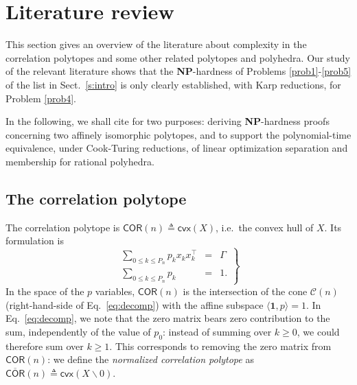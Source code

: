 \documentclass[envcountsect,envcountsame]{svjour3}
\theoremstyle{changebreak}                %
\newcommand{\transpose}[1]{{#1}^{\top}}
\newcommand{\cvx}[1]{\mathsf{cvx}(#1)}
\newcommand{\COR}[1]{\mathsf{COR}(#1)}
\newcommand{\nCOR}[1]{\mathsf{\overline{COR}}(#1)}
\newcommand{\CONX}[1]{\mathcal{C}(#1)}
\begin{document}
\section{Literature review}
\label{s:litrev}
This section gives an overview of the literature about complexity in the correlation polytopes and some other related polytopes and polyhedra. Our study of the relevant literature shows that the \textbf{NP}-hardness of Problems \ref{prob1}-\ref{prob5} of the list in Sect.~\ref{s:intro} is only clearly established, with Karp reductions, for Problem \ref{prob4}.

In the following, we shall cite \cite{gls} for two purposes: deriving \textbf{NP}-hardness proofs concerning two affinely isomorphic polytopes, and to support the polynomial-time equivalence, under Cook-Turing reductions, of linear optimization separation and membership for rational polyhedra. 

\subsection{The correlation polytope}
The correlation polytope \cite{pitowsky} is $\COR{n}\triangleq\cvx{X}$, i.e.~the convex hull of $X$. Its formulation is
\begin{equation}
  \left.\begin{array}{rcl}
    \sum\limits_{0\le k\le P_n} p_k x_k\transpose{x}_k &=& \Gamma \\
    \sum\limits_{0\le k\le P_n} p_k &=& 1.
    \end{array}\right\}
  \label{eq:cor}
\end{equation}
In the space of the $p$ variables, $\COR{n}$ is the intersection of the cone $\CONX{n}$ (right-hand-side of Eq.~\eqref{eq:decomp}) with the affine subspace $\langle\mathbf{1},p\rangle=1$. In Eq.~\eqref{eq:decomp}, we note that the zero matrix bears zero contribution to the sum, independently of the value of $p_0$: instead of summing over $k\ge 0$, we could therefore sum over $k\ge 1$. This corresponds to removing the zero matrix from $\COR{n}$: we define the \textit{normalized correlation polytope} as $\nCOR{n}\triangleq\cvx{X\smallsetminus 0}$.
\end{document}

